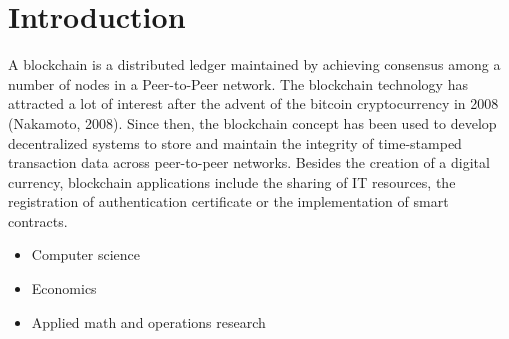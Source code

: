 \chapter{Introduction}\label{sec:introduction}

A blockchain is a distributed ledger maintained by achieving consensus among a number of nodes in a Peer-to-Peer network. The blockchain technology has attracted a lot of interest after the advent of the bitcoin cryptocurrency in 2008 (Nakamoto, 2008). Since then, the blockchain concept has been used to develop decentralized systems to store and maintain the integrity of time-stamped transaction data across peer-to-peer networks. Besides the creation of a digital currency, blockchain applications include the sharing of IT resources, the registration of authentication certificate or the implementation of smart contracts. 
\begin{itemize}
	\item Computer science
	\item Economics
	\item Applied math and operations research
\end{itemize}
\newpage